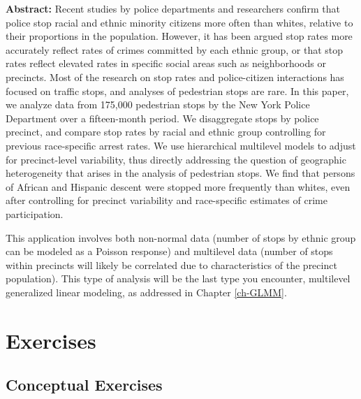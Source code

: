 \documentclass[
]{krantz}
\renewenvironment{quote}{\begin{VF}}{\end{VF}}
\begin{document}
\begin{quote}
\textbf{Abstract:} Recent studies by police departments and researchers confirm that police stop racial and ethnic minority citizens more often than whites, relative to their proportions in the population. However, it has been argued stop rates more accurately reflect rates of crimes committed by each ethnic group, or that stop rates reflect elevated rates in specific social areas such as neighborhoods or precincts. Most of the research on stop rates and police-citizen interactions has focused on traffic stops, and analyses of pedestrian stops are rare. In this paper, we analyze data from 175,000 pedestrian stops by the New York Police Department over a fifteen-month period. We disaggregate stops by police precinct, and compare stop rates by racial and ethnic group controlling for previous race-specific arrest rates. We use hierarchical multilevel models to adjust for precinct-level variability, thus directly addressing the question of geographic heterogeneity that arises in the analysis of pedestrian stops. We find that persons of African and Hispanic descent were stopped more frequently than whites, even after controlling for precinct variability and race-specific estimates of crime participation.
\end{quote}

This application involves both non-normal data (number of stops by ethnic group can be modeled as a Poisson response) and multilevel data (number of stops within precincts will likely be correlated due to characteristics of the precinct population). This type of analysis will be the last type you encounter, multilevel generalized linear modeling, as addressed in Chapter \ref{ch-GLMM}.

\hypertarget{exercises}{%
\section{Exercises}\label{exercises}}

\hypertarget{conceptual-exercises}{%
\subsection{Conceptual Exercises}\label{conceptual-exercises}}
\end{document}
